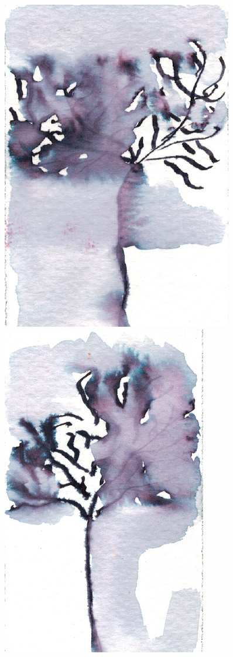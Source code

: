 \begin{center}
\includegraphics[scale=0.5]{./presentation/gauche2}
\hspace{1cm}
\includegraphics[scale=0.5]{./presentation/droite2}
\end{center}

